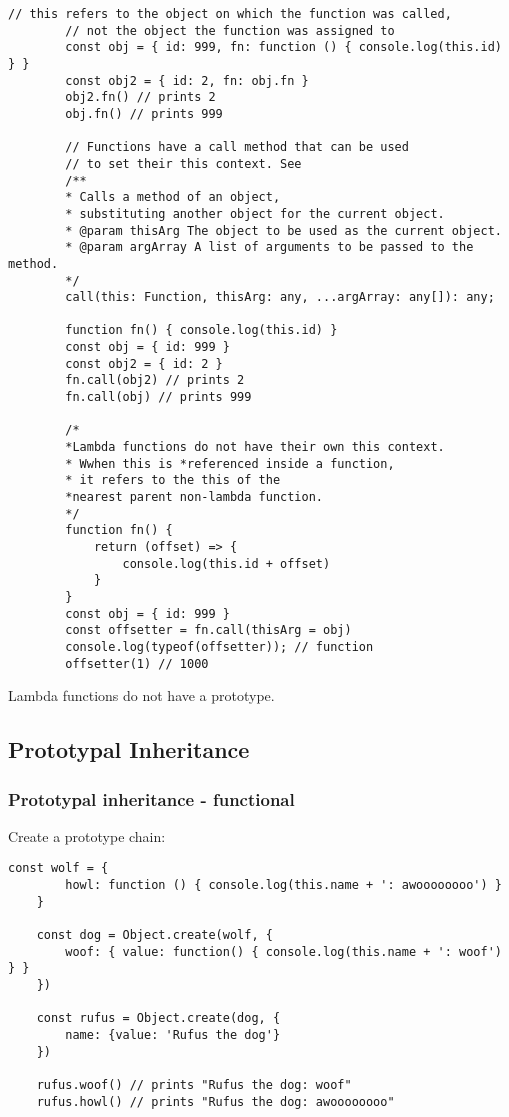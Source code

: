 \documentclass{scrartcl}
\begin{document}
    \begin{lstlisting}[style=ES6]
        // this refers to the object on which the function was called,
        // not the object the function was assigned to
        const obj = { id: 999, fn: function () { console.log(this.id) } }
        const obj2 = { id: 2, fn: obj.fn }
        obj2.fn() // prints 2
        obj.fn() // prints 999

        // Functions have a call method that can be used
        // to set their this context. See
        /**
        * Calls a method of an object,
        * substituting another object for the current object.
        * @param thisArg The object to be used as the current object.
        * @param argArray A list of arguments to be passed to the method.
        */
        call(this: Function, thisArg: any, ...argArray: any[]): any;

        function fn() { console.log(this.id) }
        const obj = { id: 999 }
        const obj2 = { id: 2 }
        fn.call(obj2) // prints 2
        fn.call(obj) // prints 999

        /*
        *Lambda functions do not have their own this context.
        * Wwhen this is *referenced inside a function,
        * it refers to the this of the
        *nearest parent non-lambda function.
        */
        function fn() {
            return (offset) => {
                console.log(this.id + offset)
            }
        }
        const obj = { id: 999 }
        const offsetter = fn.call(thisArg = obj)
        console.log(typeof(offsetter)); // function
        offsetter(1) // 1000
    \end{lstlisting}


    Lambda functions do not have a prototype.



\subsection{Prototypal Inheritance}
\subsubsection{Prototypal inheritance - functional}
    Create a prototype chain:
\begin{lstlisting}[style=ES6]
    const wolf = {
        howl: function () { console.log(this.name + ': awoooooooo') }
    }

    const dog = Object.create(wolf, {
        woof: { value: function() { console.log(this.name + ': woof') } }
    })

    const rufus = Object.create(dog, {
        name: {value: 'Rufus the dog'}
    })

    rufus.woof() // prints "Rufus the dog: woof"
    rufus.howl() // prints "Rufus the dog: awoooooooo"
\end{lstlisting}
\end{document}
